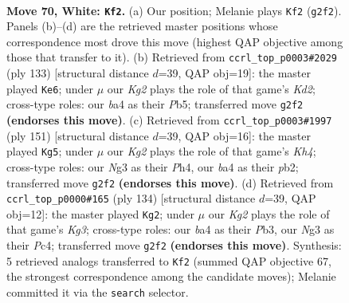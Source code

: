 \documentclass[11pt]{article}
\begin{document}
\clearpage

\begin{figure}[p]\centering
\begin{subfigure}{0.46\textwidth}\centering
\resizebox{\linewidth}{!}{%
\newchessgame
\chessboard[
  setfen={8/2r2p1p/n5p1/4P3/b4Pp1/6N1/3k2KP/1B6 w - - 30 70},
  showmover=false,
  pgfstyle=straightmove, color=movearrow, markmove={g2-f2}
]}
\caption{}
\end{subfigure}\hfill
\begin{subfigure}{0.46\textwidth}\centering
\resizebox{\linewidth}{!}{%
\newchessgame
\chessboard[
  setfen={8/3kn1p1/5p1p/1pP4P/1P2K1P1/2B5/8/8 b - - 10 67},
  showmover=false,
  pgfstyle=straightmove, color=movearrow, markmove={d7-e6}
]}
\caption{}
\end{subfigure}
\\[4pt]
\begin{subfigure}{0.46\textwidth}\centering
\resizebox{\linewidth}{!}{%
\newchessgame
\chessboard[
  setfen={8/2B5/4b3/1p5k/1P3p1p/5P1P/1P4P1/6K1 b - - 23 76},
  showmover=false,
  pgfstyle=straightmove, color=movearrow, markmove={h5-g5}
]}
\caption{}
\end{subfigure}\hfill
\begin{subfigure}{0.46\textwidth}\centering
\resizebox{\linewidth}{!}{%
\newchessgame
\chessboard[
  setfen={8/1p4k1/2p5/2b1Np2/2Pp1P2/1P4K1/4P3/8 w - - 9 68},
  showmover=false,
  pgfstyle=straightmove, color=movearrow, markmove={g3-g2}
]}
\caption{}
\end{subfigure}
\caption{\textbf{Move 70, White: \texttt{Kf2}.} (a) Our position; Melanie plays \texttt{Kf2} (\texttt{g2f2}). Panels (b)--(d) are the retrieved master positions whose correspondence most drove this move (highest QAP objective among those that transfer to it). (b) Retrieved from \texttt{ccrl\_top\_p0003\#2029} (ply 133) [structural distance $d$=39, QAP obj=19]: the master played \texttt{Ke6}; under $\mu$ our \emph{Kg2} plays the role of that game's \emph{Kd2}; cross-type roles: our \emph{b}a4 as their \emph{P}b5; transferred move \texttt{g2f2} \textbf{(endorses this move)}. (c) Retrieved from \texttt{ccrl\_top\_p0003\#1997} (ply 151) [structural distance $d$=39, QAP obj=16]: the master played \texttt{Kg5}; under $\mu$ our \emph{Kg2} plays the role of that game's \emph{Kh4}; cross-type roles: our \emph{N}g3 as their \emph{P}h4, our \emph{b}a4 as their \emph{p}b2; transferred move \texttt{g2f2} \textbf{(endorses this move)}. (d) Retrieved from \texttt{ccrl\_top\_p0000\#165} (ply 134) [structural distance $d$=39, QAP obj=12]: the master played \texttt{Kg2}; under $\mu$ our \emph{Kg2} plays the role of that game's \emph{Kg3}; cross-type roles: our \emph{b}a4 as their \emph{P}b3, our \emph{N}g3 as their \emph{P}c4; transferred move \texttt{g2f2} \textbf{(endorses this move)}. Synthesis: 5 retrieved analogs transferred to \texttt{Kf2} (summed QAP objective 67, the strongest correspondence among the candidate moves); Melanie committed it via the \texttt{search} selector.}
\label{fig:thought-m138}
\end{figure}
\end{document}

